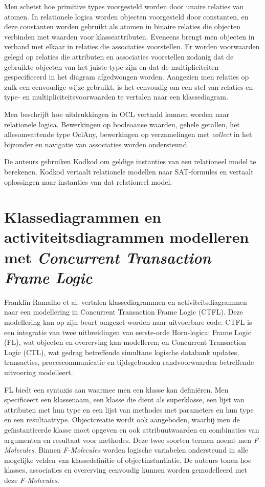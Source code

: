Men schetst hoe primitive types voorgesteld worden door unaire relaties van atomen. In relationele logica worden objecten voorgesteld door constanten, en deze constanten worden gebruikt als atomen in binaire relaties die objecten verbinden met waarden voor klasseattributen. Eveneens brengt men objecten in verband met elkaar in relaties die associaties voorstellen. Er worden voorwaarden gelegd op relaties die attributen en associaties voorstellen zodanig dat de gebruikte objecten van het juiste type zijn en dat de multipliciteiten gespecificeerd in het diagram afgedwongen worden. Aangezien men relaties op zulk een eenvoudige wijze gebruikt, is het eenvoudig om een stel van relaties en type- en multipliciteitsvoorwaarden te vertalen naar een klassediagram.

Men beschrijft hoe uitdrukkingen in OCL vertaald kunnen worden naar relationele logica. Bewerkingen op booleaanse waarden, gehele getallen, het allesomvattende type OclAny\cite{WarmerJosB1999Ocl:}, bewerkingen op verzamelingen met \textit{collect} in het bijzonder en navigatie van associaties worden ondersteund.

De auteurs gebruiken Kodkod\cite{10.1007/978-3-540-71209-1_49} om geldige instanties van een relationeel model te berekenen. Kodkod vertaalt relationele modellen naar SAT-formules en vertaalt oplossingen naar instanties van dat relationeel model.

\section{Klassediagrammen en activiteitsdiagrammen modelleren met \textit{Concurrent Transaction Frame Logic}}

Franklin Ramalho et al.\cite{RamalhoFranklin2004CTFL} vertalen klassediagrammen en activiteitsdiagrammen\cite{RumbaughJames2005Tuml} naar een modellering in Concurrent Transaction Frame Logic\cite{kifer1995deductive,kifer1996concurrency} (CTFL). Deze modellering kan op zijn beurt omgezet worden naar uitvoerbare code. CTFL is een integratie van twee uitbreidingen van eerste-orde Horn-logica: Frame Logic (FL), wat objecten en overerving kan modelleren; en Concurrent Transaction Logic (CTL), wat gedrag betreffende simultane logische databank updates, transacties, procescommunicatie en tijdsgebonden randvoorwaarden betreffende uitvoering modelleert.

FL biedt een syntaxis aan waarmee men een klasse kan defini\"eren. Men specificeert een klassenaam, een klasse die dient als superklasse, een lijst van attributen met hun type en een lijst van methodes met parameters en hun type en een resultaattype. Objectcreatie wordt ook aangeboden, waarbij men de ge\"instantieerde klasse moet opgeven en ook attribuutwaarden en combinaties van argumenten en resultaat voor methodes. Deze twee soorten termen noemt men \textit{F-Molecules}. Binnen \textit{F-Molecules} worden logische variabelen ondersteund in alle mogelijke velden van klassedefinitie of objectinstantiatie. De auteurs tonen hoe klasses, associaties en overerving eenvoudig kunnen worden gemodelleerd met deze \textit{F-Molecules}.

